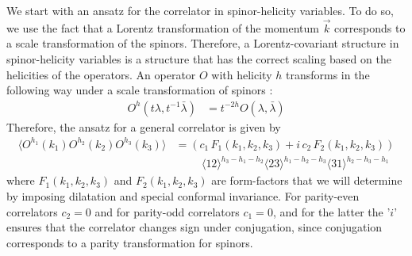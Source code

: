 \documentclass[a4paper,11pt]{article}
\begin{document}
We start with an ansatz for the correlator in spinor-helicity variables. To do so, we use the fact that a Lorentz transformation of the momentum $\vec{k}$ corresponds to a scale transformation of the spinors. Therefore, a Lorentz-covariant structure in spinor-helicity variables is a structure that has the correct scaling based on the helicities of the operators. An operator $O$ with helicity $h$ transforms in the following way under a scale transformation of spinors :
\begin{align}
O^h(t\lambda, t^{-1}\bar{\lambda}) &= t^{-2h}O(\lambda, \bar{\lambda})
\end{align}
Therefore, the ansatz for a general correlator is given by
\begin{align}\label{generalansatz}
\langle O^{h_1}(k_1)O^{h_2}(k_2)O^{h_3}(k_3) \rangle&=(c_1\,F_1(k_1, k_2, k_3) +i\,c_2\,F_2(k_1, k_2, k_3) )\nonumber\\[5pt]
&\hspace{1cm}\langle 12 \rangle^{h_3-h_1-h_2} \langle 23 \rangle^{h_1-h_2-h_3} \langle 31 \rangle^{h_2-h_3-h_1}
\end{align}
where $F_1(k_1, k_2, k_3)$ and $F_2(k_1, k_2, k_3)$ are form-factors that we will determine by imposing dilatation and special conformal invariance. 
For parity-even correlators $c_2=0$ and for parity-odd correlators $c_1=0$, and for the latter the '$i$' ensures that the correlator changes sign under conjugation, since conjugation corresponds to a parity transformation for spinors. 


\end{document}
